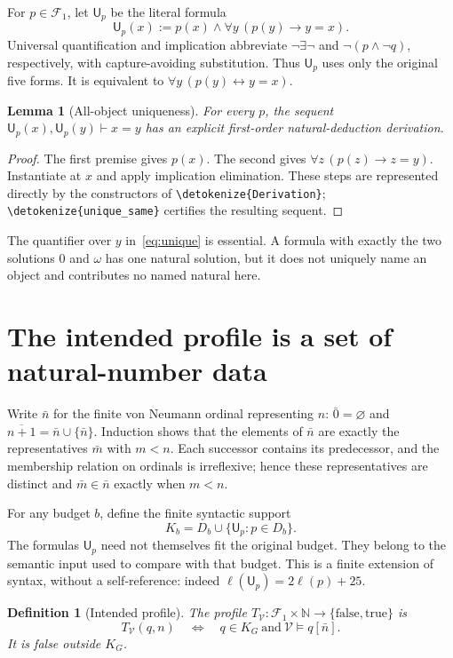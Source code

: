 \documentclass[11pt]{article}
\newtheorem{lemma}[theorem]{Lemma}
\newtheorem{definition}[theorem]{Definition}
\newcommand{\N}{\mathbb N}
\newcommand{\V}{\mathcal V}
\newcommand{\F}{\mathcal F}
\newcommand{\U}{\mathsf U}
\newcommand{\code}[1]{{\small\expandafter\nolinkurl\expandafter{\detokenize{#1}}}}
\begin{document}
For $p\in\F_1$, let $\U_p$ be the literal formula
\begin{equation}\label{eq:unique}
 \U_p(x):=p(x)\wedge\forall y\,(p(y)\longrightarrow y=x).
\end{equation}
Universal quantification and implication abbreviate
$\neg\exists\neg$ and $\neg(p\wedge\neg q)$, respectively, with
capture-avoiding substitution. Thus $\U_p$ uses only the original five forms.
It is equivalent to $\forall y\,(p(y)\leftrightarrow y=x)$.

\begin{lemma}[All-object uniqueness]\label{lem:unique}
For every $p$, the sequent $\U_p(x),\U_p(y)\vdash x=y$ has an explicit
first-order natural-deduction derivation.
\end{lemma}
\begin{proof}
The first premise gives $p(x)$. The second gives
$\forall z\,(p(z)\to z=y)$. Instantiate at $x$ and apply implication
elimination. These steps are represented directly by the constructors of
\code{Derivation}; \code{unique_same} certifies the resulting sequent.
\end{proof}

The quantifier over $y$ in~\eqref{eq:unique} is essential. A formula with
exactly the two solutions $0$ and $\omega$ has one natural solution, but it
does not uniquely name an object and contributes no named natural here.

\section{The intended profile is a set of natural-number data}

Write $\bar n$ for the finite von Neumann ordinal representing $n$:
$\bar0=\varnothing$ and $\overline{n+1}=\bar n\cup\{\bar n\}$.
Induction shows that the elements of $\bar n$ are exactly the representatives
$\bar m$ with $m<n$. Each successor contains its predecessor, and the
membership relation on ordinals is irreflexive; hence these representatives
are distinct and $\bar m\in\bar n$ exactly when $m<n$.

For any budget $b$, define the finite syntactic support
\[
                  K_b=D_b\cup\{\U_p:p\in D_b\}.
\]
The formulas $\U_p$ need not themselves fit the original budget. They belong
to the semantic input used to compare with that budget. This is a finite
extension of syntax, without a self-reference: indeed
$\ell(\U_p)=2\ell(p)+25$.

\begin{definition}[Intended profile]\label{def:profile}
The profile $T_{\V}:\F_1\times\N\to\{\mathrm{false},\mathrm{true}\}$ is
\[
 T_{\V}(q,n)\quad\Longleftrightarrow\quad
 q\in K_G\ \text{and}\ \V\models q[\bar n].
\]
It is false outside $K_G$.
\end{definition}
\end{document}
